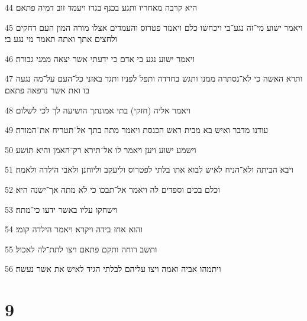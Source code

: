 \par 44 היא קרבה מאחריו ותגע בכנף בגדו ויעמד זוב דמיה פתאם׃
\par 45 ויאמר ישוע מי־זה נגע־בי ויכחשו כלם ויאמר פטרוס והעמדים אצלו מורה המון העם דחקים ולחצים אתך ואתה תאמר מי נגע בי׃
\par 46 ויאמר ישוע נגע בי אדם כי ידעתי אשר יצאה ממני גבורה׃
\par 47 ותרא האשה כי לא־נסתרה ממנו ותגש בחרדה ותפל לפניו ותגד באזני כל־העם על־מה נגעה בו ואת אשר נרפאה פתאם׃
\par 48 ויאמר אליה (חזקי) בתי אמונתך הושיעה לך לכי לשלום׃
\par 49 עודנו מדבר ואיש בא מבית ראש הכנסת ויאמר מתה בתך אל־תטריח את־המורה׃
\par 50 וישמע ישוע ויען ויאמר לו אל־תירא רק־האמן והיא תושע׃
\par 51 ויבא הביתה ולא־הניח לאיש לבוא אתו בלתי לפטרוס וליעקב וליוחנן ולאבי הילדה ולאמה׃
\par 52 וכלם בכים וספדים לה ויאמר אל־תבכו כי לא מתה אך־ישנה היא׃
\par 53 וישחקו עליו באשר ידעו כי־מתה׃
\par 54 והוא אחז בידה ויקרא ויאמר הילדה קומי׃
\par 55 ותשב רוחה ותקם פתאם ויצו לתת־לה לאכול׃
\par 56 ויתמהו אביה ואמה ויצו עליהם לבלתי הגיד לאיש את אשר נעשה׃

\chapter{9}

